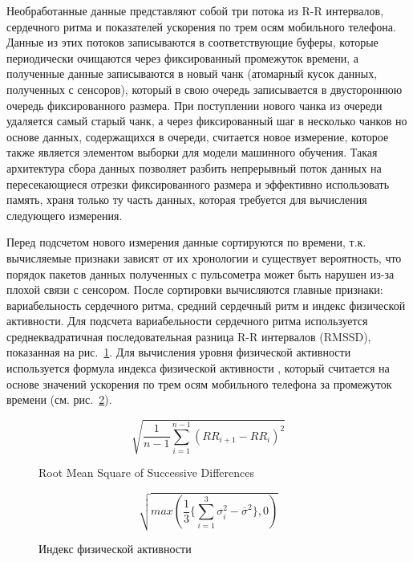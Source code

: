 \documentclass[14pt]{matmex-diploma-custom}
\begin{document}
Необработанные данные представляют собой три потока из R-R интервалов,
сердечного ритма и показателей ускорения по трем осям мобильного телефона.
Данные из этих потоков записываются в соответствующие буферы, которые
периодически очищаются через фиксированный промежуток времени, а полученные
данные записываются в новый чанк (атомарный кусок данных, полученных с
сенсоров), который в свою очередь записывается в двустороннюю очередь
фиксированного размера. При поступлении нового чанка из очереди удаляется самый
старый чанк, а через фиксированный шаг в несколько чанков но основе данных,
содержащихся в очереди, считается новое измерение, которое также является
элементом выборки для модели машинного обучения. Такая архитектура сбора данных
позволяет разбить непрерывный поток данных на пересекающиеся отрезки
фиксированного размера и эффективно использовать память, храня только ту часть
данных, которая требуется для вычисления следующего измерения.

Перед подсчетом нового измерения данные сортируются по времени, т.к. вычисляемые
признаки зависят от их хронологии и существует вероятность, что порядок пакетов
данных полученных с пульсометра может быть нарушен из-за плохой связи с
сенсором. После сортировки вычисляются главные признаки: вариабельность
сердечного ритма, средний сердечный ритм и индекс физической активности. Для
подсчета вариабельности сердечного ритма используется среднеквадратичная
последовательная разница R-R интервалов (RMSSD), показанная на
рис.~\ref{fig:rmssd}. Для вычисления уровня физической активности используется
формула индекса физической активности \cite{article:activity_index}, который
считается на основе значений ускорения по трем осям мобильного телефона за
промежуток времени (см. рис.~\ref{fig:activity_index}).

\begin{figure}[ht]
  \centering
  \begin{equation}
    \sqrt{\frac{1}{n-1}\sum_{i=1}^{n-1}(RR_{i+1} - RR_{i})^2}
  \end{equation}
  \caption{Root Mean Square of Successive Differences}
  \label{fig:rmssd}
\end{figure}

\begin{figure}[ht]
  \centering
  \begin{equation}
    \sqrt{max(\frac{1}{3}\{\sum_{i=1}^3\sigma_i^2 - \overline{\sigma}^2\}, 0)}
  \end{equation}
  \caption{Индекс физической активности}
  \label{fig:activity_index}
\end{figure}
\end{document}

